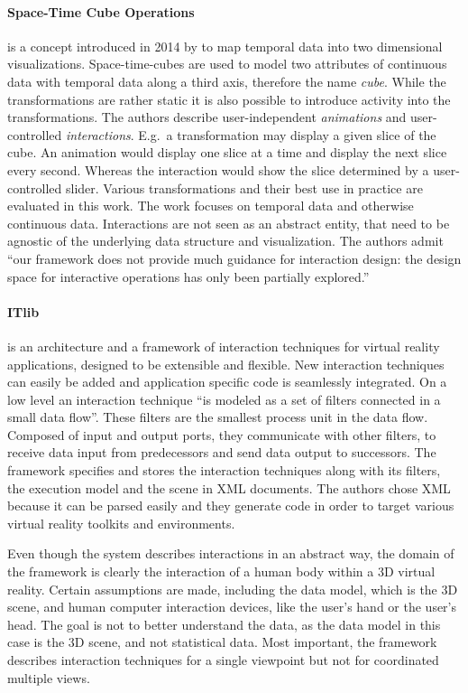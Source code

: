 \paragraph{Space-Time Cube Operations}
is a concept introduced in 2014 by \textcite{Bach2014} to map temporal data into two dimensional visualizations.
Space-time-cubes are used to model two attributes of continuous data with temporal data along a third axis, therefore the name \emph{cube}.
While the transformations are rather static it is also possible to introduce activity into the transformations.
The authors describe user-independent \emph{animations} and user-controlled \emph{interactions}.
E.g.\ a transformation may display a given slice of the cube.
An animation would display one slice at a time and display the next slice every second.
Whereas the interaction would show the slice determined by a user-controlled slider.
Various transformations and their best use in practice are evaluated in this work.
The work focuses on temporal data and otherwise continuous data.
Interactions are not seen as an abstract entity, that need to be agnostic of the underlying data structure and visualization.
The authors admit ``our framework does not provide much guidance for interaction design: the design space for interactive operations has only been partially explored.''\cite[Other limitations, p.~15]{Bach2014}

\paragraph{ITlib\cite{Figueroa2001}} is an architecture and a framework of interaction techniques for virtual reality applications, designed to be extensible and flexible.
New interaction techniques can easily be added and application specific code is seamlessly integrated.
On a low level an interaction technique ``is modeled as a set of filters connected in a small data flow''\cite[Basic concept, p.~2]{Figueroa2001}.
These filters are the smallest process unit in the data flow.
Composed of input and output ports, they communicate with other filters, to receive data input from predecessors and send data output to successors.
The framework specifies and stores the interaction techniques along with its filters, the execution model and the scene in XML documents.
The authors chose XML because it can be parsed easily and they generate code in order to target various virtual reality toolkits and environments.

Even though the system describes interactions in an abstract way, the domain of the framework is clearly the interaction of a human body within a 3D virtual reality.
Certain assumptions are made, including the data model, which is the 3D scene, and human computer interaction devices, like the user's hand or the user's head.
The goal is not to better understand the data, as the data model in this case is the 3D scene, and not statistical data.
Most important, the framework describes interaction techniques for a single viewpoint but not for coordinated multiple views.

